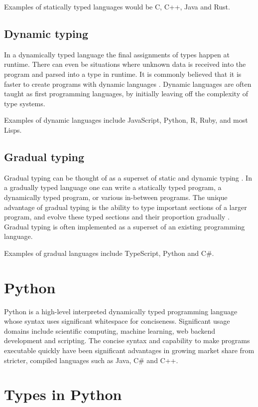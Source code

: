 Examples of statically typed languages would be C, C++, Java and Rust.

\subsection{Dynamic typing}
In a dynamically typed language the final assignments of types happen at runtime. There can even be situations where unknown data is received into the program and parsed into a type in runtime. It is commonly believed that it is faster to create programs with dynamic languages \citetemp. Dynamic languages are often taught as first programming languages, by initially leaving off the complexity of type systems.

Examples of dynamic languages include JavaScript, Python, R, Ruby, and most Lisps.

\subsection{Gradual typing}
Gradual typing can be thought of as a superset of static and dynamic typing \cite{siek_refined_gradual_2015}. In a gradually typed language one can write a statically typed program, a dynamically typed program, or various in-between programs. The unique advantage of gradual typing is the ability to type important sections of a larger program, and evolve these typed sections and their proportion gradually \cite{siek_refined_gradual_2015}. %
Gradual typing is often implemented as a superset of an existing programming language.


Examples of gradual languages include TypeScript, Python and C\#.


\section{Python}
Python is a high-level interpreted dynamically typed programming language whose syntax uses significant whitespace for conciseness. Significant usage domains include scientific computing, machine learning, web backend development and scripting. The concise syntax and capability to make programs executable quickly have been significant advantages in growing market share from stricter, compiled languages such as Java, C\# and C++.


\section{Types in Python}

